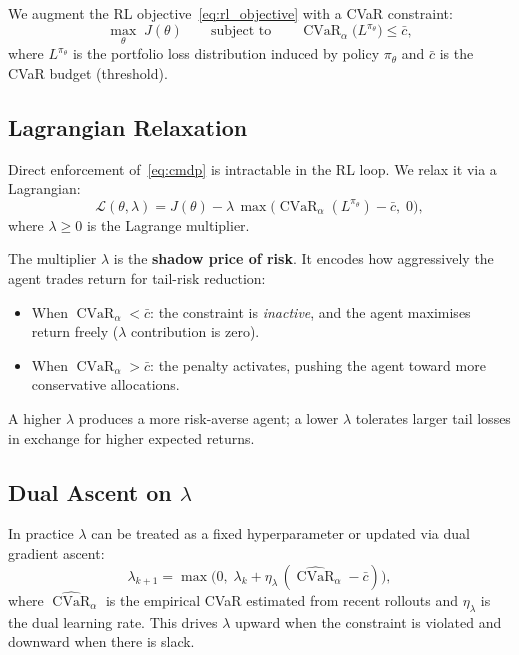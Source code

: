 \documentclass[11pt, a4paper]{article}
\theoremstyle{definition}
\theoremstyle{plain}
\theoremstyle{remark}
\newcommand{\CVaR}{\operatorname{CVaR}}
\begin{document}
We augment the RL objective~\eqref{eq:rl_objective} with a CVaR constraint:
\begin{equation}
    \max_\theta \; J(\theta)
    \qquad \text{subject to} \qquad
    \CVaR_\alpha\!\bigl(L^{\pi_\theta}\bigr) \leq \bar{c},
    \label{eq:cmdp}
\end{equation}
where $L^{\pi_\theta}$ is the portfolio loss distribution induced by policy
$\pi_\theta$ and $\bar{c}$ is the CVaR budget (threshold).

\subsection{Lagrangian Relaxation}

Direct enforcement of~\eqref{eq:cmdp} is intractable in the RL loop. We
relax it via a Lagrangian:
\begin{equation}
    \mathcal{L}(\theta, \lambda)
    = J(\theta) - \lambda\,
      \max\!\bigl(\CVaR_\alpha(L^{\pi_\theta}) - \bar{c},\; 0\bigr),
    \label{eq:lagrangian}
\end{equation}
where $\lambda \geq 0$ is the Lagrange multiplier.

\begin{keyresult}
The multiplier $\lambda$ is the \textbf{shadow price of risk}. It encodes
how aggressively the agent trades return for tail-risk reduction:
\begin{itemize}[leftmargin=2em]
    \item When $\CVaR_\alpha < \bar{c}$: the constraint is \emph{inactive},
          and the agent maximises return freely ($\lambda$ contribution is zero).
    \item When $\CVaR_\alpha > \bar{c}$: the penalty activates, pushing the
          agent toward more conservative allocations.
\end{itemize}
A higher $\lambda$ produces a more risk-averse agent; a lower $\lambda$
tolerates larger tail losses in exchange for higher expected returns.
\end{keyresult}

\subsection{Dual Ascent on $\lambda$}

In practice $\lambda$ can be treated as a fixed hyperparameter or updated
via dual gradient ascent:
\begin{equation}
    \lambda_{k+1}
    = \max\!\bigl(0,\;
      \lambda_k + \eta_\lambda\,
      (\widehat{\CVaR}_\alpha - \bar{c})\bigr),
    \label{eq:dual_ascent}
\end{equation}
where $\widehat{\CVaR}_\alpha$ is the empirical CVaR estimated from
recent rollouts and $\eta_\lambda$ is the dual learning rate. This drives
$\lambda$ upward when the constraint is violated and downward when there
is slack.
\end{document}

